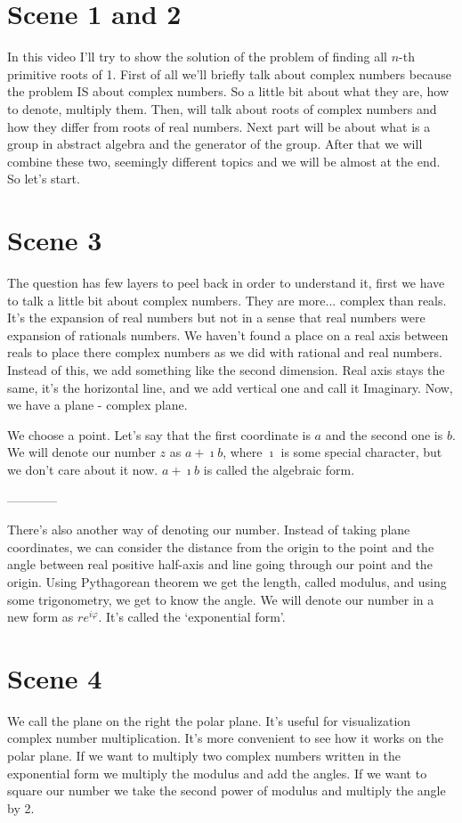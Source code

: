 \documentclass[12pt]{article}
\newcommand{\p}{\varphi}
\newcommand{\mybox}[1]{\colorbox{Goldenrod2}{#1}}
\begin{document}
\section*{\mybox{Scene 1 and 2}}
    In this video I'll try to show the solution of the problem of finding all $n$-th primitive roots of 1. First of all we'll briefly talk about complex numbers because the problem IS about complex numbers. So a little bit about what they are, how to denote, multiply them. Then, will talk about roots of complex numbers and how they differ from roots of real numbers. Next part will be about what is a group in abstract algebra and the generator of the group. After that we will combine these two, seemingly different topics and we will be almost at the end. So let's start.

\section*{\mybox{Scene 3}}
    The question has few layers to peel back in order to understand it, first we have to talk a little bit about complex numbers. They are more... complex than reals. It's the expansion of real numbers but not in a sense that real numbers were expansion of rationals numbers. We haven't found a place on a real axis between reals to place there complex numbers as we did with rational and real numbers. Instead of this, we add something like the second dimension. Real axis stays the same, it's the horizontal line, and we add vertical one and call it Imaginary. Now, we have a plane - complex plane.

    We choose a point. Let's say that the first coordinate is $a$ and the second one is $b$. We will denote our number $z$ as $a+\imath b$, where $\imath$ is some special character, but we don't care about it now. $a+\imath b$ is called the algebraic form.

    ------------

    There's also another way of denoting our number. Instead of taking plane coordinates, we can  consider the distance from the origin to the point and the angle between real positive half-axis and line going through our point and the origin. Using Pythagorean theorem we get the length, called modulus, and using some trigonometry, we get to know the angle. We will denote our number in a new form as $re^{i\p}$. It's called the `exponential form'.


\section*{\mybox{Scene 4}}
    We call the plane on the right the polar plane. It's useful for visualization complex number multiplication. It's more convenient to see how it works on the polar plane. If we want to multiply two complex numbers written in the exponential form we multiply the modulus and add the angles. If we want to square our number we take the second power of modulus and multiply the angle by 2.
\end{document}
